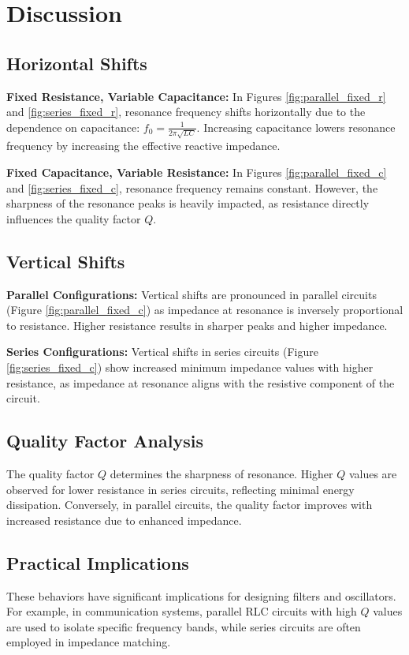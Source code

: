 \documentclass[journal]{IEEEtran}
\begin{document}
\section{Discussion}
\subsection{Horizontal Shifts}
\textbf{Fixed Resistance, Variable Capacitance:} In Figures \ref{fig:parallel_fixed_r} and \ref{fig:series_fixed_r}, resonance frequency shifts horizontally due to the dependence on capacitance: \(f_0 = \frac{1}{2\pi\sqrt{LC}}\). Increasing capacitance lowers resonance frequency by increasing the effective reactive impedance.

\textbf{Fixed Capacitance, Variable Resistance:} In Figures \ref{fig:parallel_fixed_c} and \ref{fig:series_fixed_c}, resonance frequency remains constant. However, the sharpness of the resonance peaks is heavily impacted, as resistance directly influences the quality factor \(Q\).

\subsection{Vertical Shifts}
\textbf{Parallel Configurations:} Vertical shifts are pronounced in parallel circuits (Figure \ref{fig:parallel_fixed_c}) as impedance at resonance is inversely proportional to resistance. Higher resistance results in sharper peaks and higher impedance.

\textbf{Series Configurations:} Vertical shifts in series circuits (Figure \ref{fig:series_fixed_c}) show increased minimum impedance values with higher resistance, as impedance at resonance aligns with the resistive component of the circuit.

\subsection{Quality Factor Analysis}
The quality factor \(Q\) determines the sharpness of resonance. Higher \(Q\) values are observed for lower resistance in series circuits, reflecting minimal energy dissipation. Conversely, in parallel circuits, the quality factor improves with increased resistance due to enhanced impedance.

\subsection{Practical Implications}
These behaviors have significant implications for designing filters and oscillators. For example, in communication systems, parallel RLC circuits with high \(Q\) values are used to isolate specific frequency bands, while series circuits are often employed in impedance matching.
\end{document}
